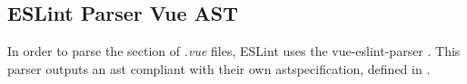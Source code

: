 \subsection{ESLint Parser Vue AST}
In order to parse the  section of \textit{.vue} files, ESLint uses the vue-eslint-parser \parencite{eslint_vue_parser}. This parser outputs an  \gls{ast} compliant with their own  \gls{ast}specification, defined in \parencite{eslint_vue_parser_ast}.




